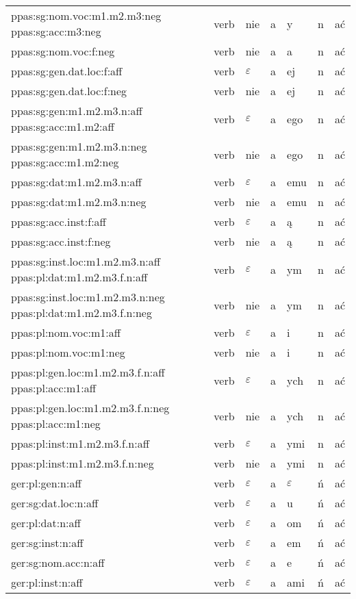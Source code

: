 \documentclass{article}
\begin{document}
\begin{longtable}{p{7cm}|l|l|l|l|l|l}
ppas:sg:nom.voc:m1.m2.m3:neg ppas:sg:acc:m3:neg & verb & nie & a & y & n & ać\\
ppas:sg:nom.voc:f:neg & verb & nie & a & a & n & ać\\
ppas:sg:gen.dat.loc:f:aff & verb & $\varepsilon$ & a & ej & n & ać\\
ppas:sg:gen.dat.loc:f:neg & verb & nie & a & ej & n & ać\\
ppas:sg:gen:m1.m2.m3.n:aff ppas:sg:acc:m1.m2:aff & verb & $\varepsilon$ & a & ego & n & ać\\
ppas:sg:gen:m1.m2.m3.n:neg ppas:sg:acc:m1.m2:neg & verb & nie & a & ego & n & ać\\
ppas:sg:dat:m1.m2.m3.n:aff & verb & $\varepsilon$ & a & emu & n & ać\\
ppas:sg:dat:m1.m2.m3.n:neg & verb & nie & a & emu & n & ać\\
ppas:sg:acc.inst:f:aff & verb & $\varepsilon$ & a & ą & n & ać\\
ppas:sg:acc.inst:f:neg & verb & nie & a & ą & n & ać\\
ppas:sg:inst.loc:m1.m2.m3.n:aff ppas:pl:dat:m1.m2.m3.f.n:aff & verb & $\varepsilon$ & a & ym & n & ać\\
ppas:sg:inst.loc:m1.m2.m3.n:neg ppas:pl:dat:m1.m2.m3.f.n:neg & verb & nie & a & ym & n & ać\\
ppas:pl:nom.voc:m1:aff & verb & $\varepsilon$ & a & i & n & ać\\
ppas:pl:nom.voc:m1:neg & verb & nie & a & i & n & ać\\
ppas:pl:gen.loc:m1.m2.m3.f.n:aff ppas:pl:acc:m1:aff & verb & $\varepsilon$ & a & ych & n & ać\\
ppas:pl:gen.loc:m1.m2.m3.f.n:neg ppas:pl:acc:m1:neg & verb & nie & a & ych & n & ać\\
ppas:pl:inst:m1.m2.m3.f.n:aff & verb & $\varepsilon$ & a & ymi & n & ać\\
ppas:pl:inst:m1.m2.m3.f.n:neg & verb & nie & a & ymi & n & ać\\
ger:pl:gen:n:aff & verb & $\varepsilon$ & a & $\varepsilon$ & ń & ać\\
ger:sg:dat.loc:n:aff & verb & $\varepsilon$ & a & u & ń & ać\\
ger:pl:dat:n:aff & verb & $\varepsilon$ & a & om & ń & ać\\
ger:sg:inst:n:aff & verb & $\varepsilon$ & a & em & ń & ać\\
ger:sg:nom.acc:n:aff & verb & $\varepsilon$ & a & e & ń & ać\\
ger:pl:inst:n:aff & verb & $\varepsilon$ & a & ami & ń & ać\\

\end{longtable}
\end{document}

